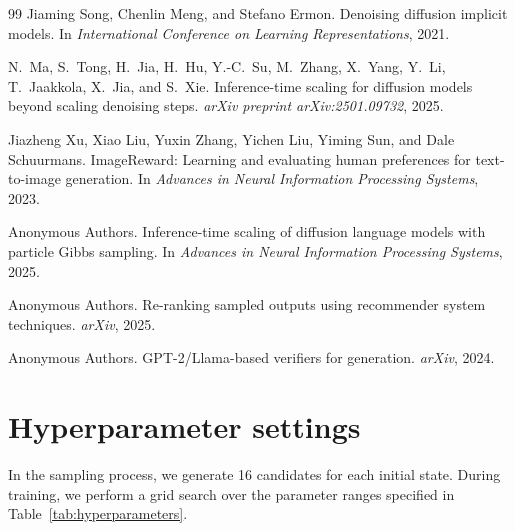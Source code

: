 \documentclass{article}
\begin{document}
\begin{thebibliography}{99}
Jiaming Song, Chenlin Meng, and Stefano Ermon.
\newblock Denoising diffusion implicit models.
\newblock In \emph{International Conference on Learning Representations}, 2021.

N.~Ma, S.~Tong, H.~Jia, H.~Hu, Y.-C.~Su, M.~Zhang, X.~Yang, Y.~Li, T.~Jaakkola, X.~Jia, and S.~Xie.
\newblock Inference-time scaling for diffusion models beyond scaling denoising steps.
\newblock \emph{arXiv preprint arXiv:2501.09732}, 2025.

Jiazheng Xu, Xiao Liu, Yuxin Zhang, Yichen Liu, Yiming Sun, and Dale Schuurmans.
\newblock ImageReward: Learning and evaluating human preferences for text-to-image generation.
\newblock In \emph{Advances in Neural Information Processing Systems}, 2023.

Anonymous Authors.
\newblock Inference-time scaling of diffusion language models with particle Gibbs sampling.
\newblock In \emph{Advances in Neural Information Processing Systems}, 2025.

Anonymous Authors.
\newblock Re-ranking sampled outputs using recommender system techniques.
\newblock \emph{arXiv}, 2025.

Anonymous Authors.
\newblock GPT-2/Llama-based verifiers for generation.
\newblock \emph{arXiv}, 2024.

\end{thebibliography}

\appendix

\section{Hyperparameter settings}

In the sampling process, we generate 16 candidates for each initial state. During training, we perform a grid search over the parameter ranges specified in Table~\ref{tab:hyperparameters}.
\end{document}
